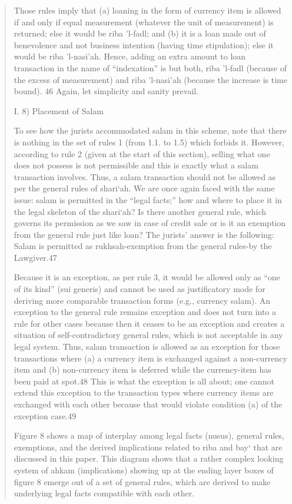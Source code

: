 \begin{quote}
Those rules imply that (a) loaning in the form of currency item is allowed if and only if equal measurement (whatever the unit of measurement) is returned; else it would be riba 'l-fadl; and (b) it is a loan made out of benevolence and not business intention (having time stipulation); else it would be riba 'l-nasi'ah. Hence, adding an extra amount to loan transaction in the name of “indexation” is but both, riba 'l-fadl (because of the excess of measurement) and riba 'l-nasi'ah (because the increase is time bound). 46 Again, let simplicity and sanity prevail.

I. 8) Placement of Salam

To see how the jurists accommodated salam in this scheme, note that there is nothing in the set of rules 1 (from 1.1. to 1.5) which forbids it. However, according to rule 2 (given at the start of this section), selling what one does not possess is not permissible and this is exactly what a salam transaction involves. Thus, a salam transaction should not be allowed as per the general rules of shari‘ah. We are once again faced with the same issue: salam is permitted in the “legal facts;” how and where to place it in the legal skeleton of the shari‘ah? Is there another general rule, which governs its permission as we saw in case of credit sale or is it an exemption from the general rule just like loan? The jurists' answer is the following: Salam is permitted as rukhsah-exemption from the general rules-by the Lawgiver.47

Because it is an exception, as per rule 3, it would be allowed only as “one of its kind” (sui generis) and cannot be used as justificatory mode for deriving more comparable transaction forms (e.g., currency salam). An exception to the general rule remains exception and does not turn into a rule for other cases because then it ceases to be an exception and creates a situation of self-contradictory general rules, which is not acceptable in any legal system. Thus, salam transaction is allowed as an exception for those transactions where (a) a currency item is exchanged against a non-currency item and (b) non-currency item is deferred while the currency-item has been paid at spot.48 This is what the exception is all about; one cannot extend this exception to the transaction types where currency items are exchanged with each other because that would violate condition (a) of the exception case.49

Figure 8 shows a map of interplay among legal facts (nusus), general rules, exemptions, and the derived implications related to riba and bay‘ that are discussed in this paper. This diagram shows that a rather complex looking system of ahkam (implications) showing up at the ending layer boxes of figure 8 emerge out of a set of general rules, which are derived to make underlying legal facts compatible with each other.


\end{quote}

